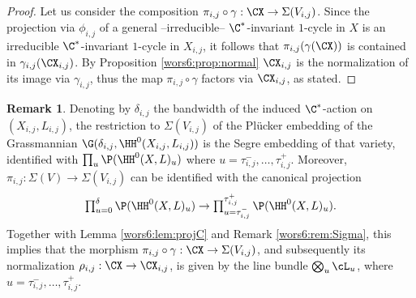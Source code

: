 \documentclass[reqno]{amsproc}
\theoremstyle{definition}
\newtheorem{remark}[theorem]{Remark}
\begin{document}
\begin{proof}
Let us consider the composition $\pi_{i,j}\circ\gamma:\CX\to \Sigma(V_{i,j})$. Since the projection via $\phi_{i,j}$ of a general --irreducible-- $\C^*$-invariant $1$-cycle in $X$ is an irreducible $\C^*$-invariant $1$-cycle in $X_{i,j}$, it follows that $\pi_{i,j}(\gamma(\CX))$ is contained in $\gamma_{i,j}(\CX_{i,j})$. By Proposition \ref{wors6:prop:normal} $\CX_{i,j}$ is the normalization of its image via $\gamma_{i,j}$, thus the map $\pi_{i,j}\circ\gamma$ factors via $\CX_{i,j}$, as stated.
\end{proof}

\begin{remark}\label{wors6:rem:projC1}
Denoting by $\delta_{i,j}$ the bandwidth of the induced $\C^*$-action on $(X_{i,j}, L_{i,j})$, the restriction to $\Sigma(V_{i,j})$ of the Pl\"ucker embedding of the Grassmannian $\G(\delta_{i,j},\HH^0(X_{i,j},L_{i,j}))$  is the Segre embedding of that variety, identified with $\prod_u \P(\HH^0(X,L)_{u}) $ where $u=\tau_{i,j}^-, \dots, \tau_{i,j}^+$. Moreover,  
$\pi_{i,j}:\Sigma(V)\to \Sigma(V_{i,j})$ can be identified with the canonical projection 
\[\textstyle \prod_{u=0}^{\delta}\P(\HH^0(X,L)_{u}) \to \prod_{u=\tau_{i,j}^-}^{\tau_{i,j}^+}\P(\HH^0(X,L)_{u}).\] Together with Lemma \ref{wors6:lem:projC} and Remark \ref{wors6:rem:Sigma}, this implies that the morphism $\pi_{i,j}\circ\gamma:\CX\to \Sigma(V_{i,j})$, and subsequently its normalization $\rho_{i,j}:\CX\to \CX_{i,j}$,  is given by the line bundle $\bigotimes_u 
{\cL_u}$, where $u=\tau_{i,j}^-, \dots, \tau_{i,j}^+$. 
\end{remark}
\end{document}
